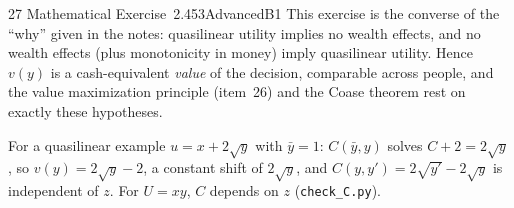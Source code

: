 \begin{exsol}{27}{\MR{} Mathematical Exercise~2.4}{53}{Advanced}{B1}
\interp This exercise is the converse of the ``why'' given in the notes: quasilinear utility
implies no wealth effects, and no wealth effects (plus monotonicity in money) imply quasilinear
utility. Hence $v(y)$ is a cash-equivalent \emph{value} of the decision, comparable across
people, and the value maximization principle (item~26) and the Coase theorem rest on exactly
these hypotheses.

\verify For a quasilinear example $u = x + 2\sqrt{y}$ with $\bar y = 1$: $C(\bar y, y)$ solves
$C + 2 = 2\sqrt{y}$, so $v(y) = 2\sqrt y - 2$, a constant shift of $2\sqrt y$, and
$C(y, y') = 2\sqrt{y'} - 2\sqrt{y}$ is independent of $z$. For $U = xy$, $C$ depends on $z$
(\texttt{check\_C.py}).

\end{exsol}
